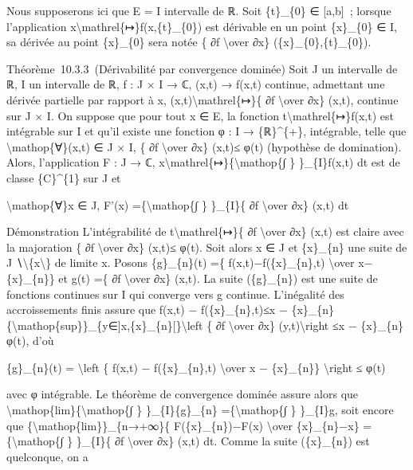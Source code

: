 \documentclass[]{article}
\begin{document}
Nous supposerons ici que E = I intervalle de ℝ. Soit \{t\}\_\{0\} ∈
{[}a,b{]}~; lorsque l'application
x\textbackslash{}mathrel\{↦\}f(x,\{t\}\_\{0\}) est dérivable en un point
\{x\}\_\{0\} ∈ I, sa dérivée au point \{x\}\_\{0\} sera notée \{ ∂f
\textbackslash{}over ∂x\} (\{x\}\_\{0\},\{t\}\_\{0\}).

Théorème~10.3.3~(Dérivabilité par convergence dominée) Soit J un
intervalle de ℝ, I un intervalle de ℝ, f : J × I → ℂ, (x,t) → f(x,t)
continue, admettant une dérivée partielle par rapport à x,
(x,t)\textbackslash{}mathrel\{↦\}\{ ∂f \textbackslash{}over ∂x\} (x,t),
continue sur J × I. On suppose que pour tout x ∈ E, la fonction
t\textbackslash{}mathrel\{↦\}f(x,t) est intégrable sur I et qu'il existe
une fonction φ : I → \{ℝ\}\^{}\{+\}, intégrable, telle que
\textbackslash{}mathop\{∀\}(x,t) ∈ J × I, \textbar{}\{ ∂f
\textbackslash{}over ∂x\} (x,t)\textbar{}≤ φ(t) (hypothèse de
domination). Alors, l'application F : J → ℂ,
x\textbackslash{}mathrel\{↦\}\{\textbackslash{}mathop\{∫ \}
\}\_\{I\}f(x,t) dt est de classe \{C\}\^{}\{1\} sur J et

\textbackslash{}mathop\{∀\}x ∈ J, F'(x) =\{\textbackslash{}mathop\{∫ \}
\}\_\{I\}\{ ∂f \textbackslash{}over ∂x\} (x,t) dt

Démonstration L'intégrabilité de t\textbackslash{}mathrel\{↦\}\{ ∂f
\textbackslash{}over ∂x\} (x,t) est claire avec la majoration
\textbar{}\{ ∂f \textbackslash{}over ∂x\} (x,t)\textbar{}≤ φ(t). Soit
alors x ∈ J et \{x\}\_\{n\} une suite de J
∖\textbackslash{}\{x\textbackslash{}\} de limite x. Posons
\{g\}\_\{n\}(t) =\{ f(x,t)−f(\{x\}\_\{n\},t) \textbackslash{}over
x−\{x\}\_\{n\}\} et g(t) =\{ ∂f \textbackslash{}over ∂x\} (x,t). La
suite (\{g\}\_\{n\}) est une suite de fonctions continues sur I qui
converge vers g continue. L'inégalité des accroissements finis assure
que \textbar{}f(x,t) − f(\{x\}\_\{n\},t)\textbar{}≤\textbar{}x −
\{x\}\_\{n\}\textbar{}\{\textbackslash{}mathop\{sup\}\}\_\{y∈{]}x,\{x\}\_\{n\}{[}\}\textbackslash{}left
\textbar{}\{ ∂f \textbackslash{}over ∂x\} (y,t)\textbackslash{}right
\textbar{}≤\textbar{}x − \{x\}\_\{n\}\textbar{}φ(t), d'où

\textbar{}\{g\}\_\{n\}(t)\textbar{} = \textbackslash{}left \textbar{}\{
f(x,t) − f(\{x\}\_\{n\},t) \textbackslash{}over x − \{x\}\_\{n\}\}
\textbackslash{}right \textbar{}≤ φ(t)

avec φ intégrable. Le théorème de convergence dominée assure alors que
\textbackslash{}mathop\{lim\}\{\textbackslash{}mathop\{∫ \}
\}\_\{I\}\{g\}\_\{n\} =\{\textbackslash{}mathop\{∫ \} \}\_\{I\}g, soit
encore que \{\textbackslash{}mathop\{lim\}\}\_\{n→+∞\}\{
F(\{x\}\_\{n\})−F(x) \textbackslash{}over \{x\}\_\{n\}−x\}
=\{\textbackslash{}mathop\{∫ \} \}\_\{I\}\{ ∂f \textbackslash{}over ∂x\}
(x,t) dt. Comme la suite (\{x\}\_\{n\}) est quelconque, on a
\end{document}
